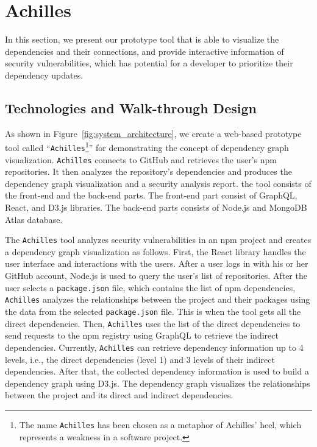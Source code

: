 \documentclass[conference]{IEEEtran}
\begin{document}
	
	\section{Achilles}
	In this section, we present our prototype tool that is able to visualize the dependencies and their connections, and provide interactive information of security vulnerabilities, which has potential for a developer to prioritize their dependency updates. 
	
	\subsection{Technologies and Walk-through Design}
	
	As shown in Figure~\ref{fig:system_architecture}, we create a web-based prototype tool called ``\texttt{Achilles}\footnote{The name \texttt{Achilles} has been chosen as a metaphor of Achilles' heel, which represents a weakness in a software project.}'' for demonstrating the concept of dependency graph visualization. \texttt{Achilles} connects to GitHub and retrieves the user's npm repositories. It then analyzes the repository's dependencies and produces the dependency graph visualization and a security analysis report.  the tool consists of the front-end and the back-end parts. The front-end part consist of GraphQL, React, and D3.js libraries. The back-end parts consists of Node.js and MongoDB Atlas database.
	
	The \texttt{Achilles} tool analyzes security vulnerabilities in an npm project and creates a dependency graph visualization as follows.
	First, the React library handles the user interface and interactions with the users. After a user logs in with his or her GitHub account, Node.js is used to query the user's list of repositories. After the user selects a \texttt{package.json} file, which contains the list of npm dependencies, \texttt{Achilles} analyzes the relationships between the project and their packages using the data from the selected \texttt{package.json} file. This is when the tool gets all the direct dependencies. Then, \texttt{Achilles}  uses the list of the direct dependencies to send requests to the npm registry using GraphQL to retrieve the indirect dependencies. Currently, \texttt{Achilles} can retrieve dependency information up to 4 levels, i.e., the direct dependencies (level 1) and 3 levels of their indirect dependencies.
	After that, the collected dependency information is used to build a dependency graph using D3.js. The dependency graph visualizes the relationships between the project and its direct and indirect dependencies.
	
\end{document}
